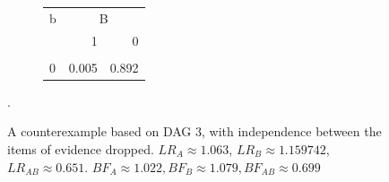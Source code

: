 \documentclass[
  10pt,
  dvipsnames,enabledeprecatedfontcommands]{scrartcl}
\begin{document}
\begin{figure}
{\begin{subfigure}[!ht]{0.45\textwidth}
\begin{table}[H]
\centering
\begin{tabular}{lrr}
\toprule
\multicolumn{1}{c}{b} & \multicolumn{2}{c}{B} \\
  & 1 & 0\\
\midrule
\cellcolor{gray!6}{1} & \cellcolor{gray!6}{0.995} & \cellcolor{gray!6}{0.108}\\
0 & 0.005 & 0.892\\
\bottomrule
\end{tabular}
\end{table}
\end{subfigure}} 
\hspace{5mm} 
\caption{A counterexample based on \textsf{DAG 3}, with independence between the items of evidence dropped.   $LR_A  \approx 1.063$, $LR_B \approx 1.159742$,  $LR_{AB} \approx 0.651$. $BF_A \approx  1.022, BF_B \approx  1.079, BF_{AB}\approx   0.699$}.
\label{fig:CPTDoubleL}
\end{figure}
\end{document}
